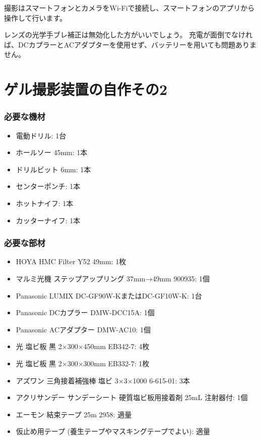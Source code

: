 \documentclass[titlepage,10pt,a4paper,uplatex]{jsbook}
\begin{document}
撮影はスマートフォンとカメラをWi-Fiで接続し、スマートフォンのアプリから操作して行います。

レンズの光学手ブレ補正は無効化した方がいいでしょう。
充電が面倒でなければ、DCカプラーとACアダプターを使用せず、バッテリーを用いても問題ありません。

\section{ゲル撮影装置の自作その2}\label{makinggelimager2}

\subsubsection{必要な機材}
\begin{itemize}
\item 電動ドリル: 1台
\item ホールソー 45mm: 1本
\item ドリルビット 6mm: 1本
\item センターポンチ: 1本
\item ホットナイフ: 1本
\item カッターナイフ: 1本
\end{itemize}

\subsubsection{必要な部材}
\begin{itemize}
\item HOYA HMC Filter Y52 49mm: 1枚
\item マルミ光機 ステップアップリング 37mm→49mm 900935: 1個
\item Panasonic LUMIX DC-GF90W-KまたはDC-GF10W-K: 1台
\item Panasonic DCカプラー DMW-DCC15A: 1個
\item Panasonic ACアダプター DMW-AC10: 1個
\item 光 塩ビ板 黒 2×300×450mm EB342-7: 4枚
\item 光 塩ビ板 黒 2×300×300mm EB332-7: 1枚
\item アズワン 三角接着補強棒 塩ビ 3×3×1000 6-615-01: 3本
\item アクリサンデー サンデーシート 硬質塩ビ板用接着剤 25mL 注射器付: 1個
\item エーモン 結束テープ 25m 2958: 適量
\item 仮止め用テープ (養生テープやマスキングテープでよい): 適量
\end{itemize}
\end{document}
